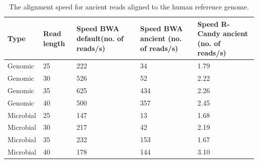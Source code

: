 \documentclass[11pt,a4paper]{report}
\begin{document}

\begin{table}[H]
  \begin{tabular}{ |  p{2cm} | p{2cm} | p{2cm} | p{2cm} |p{2cm} | }
    \hline
  	\textbf{Type} & \textbf{Read length }&\textbf{Speed BWA 
  	default\hspace{35pt}(no. of reads/s) } 	 
  	&\textbf{Speed BWA ancient \hspace{35pt}(no. of reads/s)} 
  	& \textbf{Speed R-Candy ancient \hspace{35pt}(no. of reads/s)}\\ \hline
 	  Genomic    & 25  & 222 &  34   &  1.79 \\ \hline
      Genomic    & 30  & 526 &  52   &  2.22 \\ \hline
      Genomic    & 35  & 625 &  434   &  2.26 \\ \hline
 	  Genomic	 & 40  & 500 &  357   &  2.45 \\ \hline
 	  Microbial  & 25  & 147 &  13   &  1.68 \\ \hline
      Microbial  & 30  & 217 &  42   &  2.19 \\ \hline
 	  Microbial  & 35  & 232 &  153   &  1.67 \\ \hline
 	  Microbial  & 40  & 178 &  144   &  3.10 \\ \hline
   \end{tabular}
\caption{The alignment speed for ancient reads aligned to 
the human reference genome.}
\label{speed-RG}
\end{table}
\end{document}
